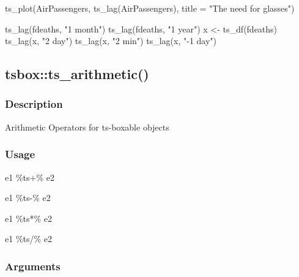 \documentclass[
  letterpaper,
  DIV=11,
  numbers=noendperiod]{scrreport}
\newenvironment{Shaded}{\begin{snugshade}}{\end{snugshade}}
\newcommand{\AttributeTok}[1]{\textcolor[rgb]{0.40,0.45,0.13}{#1}}
\newcommand{\FunctionTok}[1]{\textcolor[rgb]{0.28,0.35,0.67}{#1}}
\newcommand{\NormalTok}[1]{\textcolor[rgb]{0.00,0.23,0.31}{#1}}
\newcommand{\OtherTok}[1]{\textcolor[rgb]{0.00,0.23,0.31}{#1}}
\newcommand{\SpecialCharTok}[1]{\textcolor[rgb]{0.37,0.37,0.37}{#1}}
\newcommand{\StringTok}[1]{\textcolor[rgb]{0.13,0.47,0.30}{#1}}
\begin{document}
\begin{Shaded}
\begin{Highlighting}[]
\FunctionTok{ts\_plot}\NormalTok{(AirPassengers, }\FunctionTok{ts\_lag}\NormalTok{(AirPassengers), }\AttributeTok{title =} \StringTok{"The need for glasses"}\NormalTok{)}

\FunctionTok{ts\_lag}\NormalTok{(fdeaths, }\StringTok{"1 month"}\NormalTok{)}
\FunctionTok{ts\_lag}\NormalTok{(fdeaths, }\StringTok{"1 year"}\NormalTok{)}
\NormalTok{x }\OtherTok{\textless{}{-}} \FunctionTok{ts\_df}\NormalTok{(fdeaths)}
\FunctionTok{ts\_lag}\NormalTok{(x, }\StringTok{"2 day"}\NormalTok{)}
\FunctionTok{ts\_lag}\NormalTok{(x, }\StringTok{"2 min"}\NormalTok{)}
\FunctionTok{ts\_lag}\NormalTok{(x, }\StringTok{"{-}1 day"}\NormalTok{)}
\end{Highlighting}
\end{Shaded}

\subsection{tsbox::ts\_arithmetic()}\label{tsboxts_arithmetic}

\subsubsection{Description}\label{description-31}

Arithmetic Operators for ts-boxable objects

\subsubsection{Usage}\label{usage-31}

\begin{Shaded}
\begin{Highlighting}[]
\NormalTok{e1 }\SpecialCharTok{\%ts+\%}\NormalTok{ e2}

\NormalTok{e1 }\SpecialCharTok{\%ts{-}\%}\NormalTok{ e2}

\NormalTok{e1 }\SpecialCharTok{\%ts*\%}\NormalTok{ e2}

\NormalTok{e1 }\SpecialCharTok{\%ts/\%}\NormalTok{ e2}
\end{Highlighting}
\end{Shaded}

\subsubsection{Arguments}\label{arguments-31}
\end{document}
